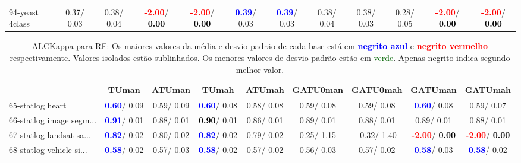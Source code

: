 \begin{table}[h]
\begin{center}
{\begin{tabular}{lc|c|c|c|c|c|c|c|c|c|c}
94-yeast 4class &   0.37/  0.03 &   0.38/  0.04 & \textcolor{red}{\textbf{ -2.00}}/\textcolor{black}{\textbf{  0.00}} & \textcolor{red}{\textbf{ -2.00}}/\textcolor{black}{\textbf{  0.00}} & \textcolor{blue}{\textbf{  0.39}}/  0.03 & \textcolor{blue}{\textbf{  0.39}}/  0.03 &   0.38/  0.04 &   0.38/  0.03 &   0.28/  0.05 & \textcolor{red}{\textbf{ -2.00}}/\textcolor{black}{\textbf{  0.00}} & \textcolor{red}{\textbf{ -2.00}}/\textcolor{black}{\textbf{  0.00}} \\\end{tabular}}\label{stratsALCKappa2aRF}
\end{center}
\end{table}
\begin{table}[h]
\caption{ALCKappa para RF: Os maiores valores da média e desvio padrão de cada base está em \textcolor{blue}{\textbf{negrito azul}} e \textcolor{red}{\textbf{negrito vermelho}} respectivamente. Valores isolados estão sublinhados. Os menores valores de desvio padrão estão em \textcolor{darkgreen}{verde}. Apenas negrito indica segundo melhor valor.}
\begin{center}\begin{tabular}{lc|c|c|c|c|c|c|c}
 & TUman & \textbf{ATUman} & TUmah & \textbf{ATUmah} & GATU0man & GATU0mah & GATUman & GATUmah\\ \hline 65-statlog heart & \textcolor{blue}{\textbf{  0.60}}/  0.09 &   0.59/  0.09 & \textcolor{blue}{\textbf{  0.60}}/  0.08 &   0.58/  0.08 &   0.59/  0.08 &   0.59/  0.08 & \textcolor{blue}{\textbf{  0.60}}/  0.08 &   0.59/  0.07 \\
66-statlog image segm... & \underline{\textcolor{blue}{\textbf{  0.91}}}/  0.01 &   0.88/  0.01 & \textcolor{black}{\textbf{  0.90}}/  0.01 &   0.86/  0.01 &   0.89/  0.01 &   0.88/  0.01 &   0.89/  0.01 &   0.88/  0.01 \\
67-statlog landsat sa... & \textcolor{blue}{\textbf{  0.82}}/  0.02 &   0.80/  0.02 & \textcolor{blue}{\textbf{  0.82}}/  0.02 &   0.79/  0.02 &   0.25/  1.15 &  -0.32/  1.40 & \textcolor{red}{\textbf{ -2.00}}/\textcolor{black}{\textbf{  0.00}} & \textcolor{red}{\textbf{ -2.00}}/\textcolor{black}{\textbf{  0.00}} \\
68-statlog vehicle si... & \textcolor{blue}{\textbf{  0.58}}/  0.02 &   0.57/  0.03 & \textcolor{blue}{\textbf{  0.58}}/  0.02 &   0.57/  0.02 &   0.56/  0.03 &   0.57/  0.02 & \textcolor{blue}{\textbf{  0.58}}/  0.03 & \textcolor{blue}{\textbf{  0.58}}/  0.02 \\

\end{tabular}
\end{center}
\end{table}
